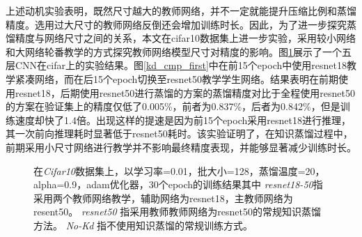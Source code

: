 上述动机实验表明，既然尺寸越大的教师网络，并不一定就能提升压缩比例和蒸馏精度。选用过大尺寸的教师网络反倒还会增加训练时长。因此，为了进一步探究蒸馏精度与网络尺寸之间的关系，本文在cifar10数据集上进一步实验，采用较小网络和大网络轮番教学的方式探究教师网络模型尺寸对精度的影响。图\ref{kd_cmp}展示了一个五层CNN在cifar上的实验结果。图\ref{kd_cmp_first}中在前15个epoch中使用resnet18教学紧凑网络，而在后15个epoch切换至resnet50教学学生网络。结果表明在前期使用resnet18，后期使用resnet50进行蒸馏的方案的蒸馏精度对比于全程使用resnet50的方案在验证集上的精度仅低了0.005\%，前者为0.837\%，后者为0.842\%，但是训练速度却快了1.4倍。出现这样的提速是因为前15个epoch采用resnet18进行推理，其一次前向推理耗时显著低于resnet50耗时。该实验证明了，在知识蒸馏过程中，前期采用小尺寸网络进行教学并不影响最终精度表现，并能够显著减少训练时长。

\begin{figure}[h]
	\centering
	\caption{在\emph{Cifar10}数据集上，以学习率=0.01，批大小=128，蒸馏温度=20，alpha=0.9，adam优化器，30个epoch的训练结果其中 \emph{resnet18-50}指采用两个教师网络教学，辅助网络为resnet18，主教师网络为resent50。 \emph{resnet50} 指采用教师教师网络为resnet50的常规知识蒸馏方法。 \emph{No-Kd} 指不使用知识蒸馏的常规训练方式。}
	\label{kd_cmp}
\end{figure}


